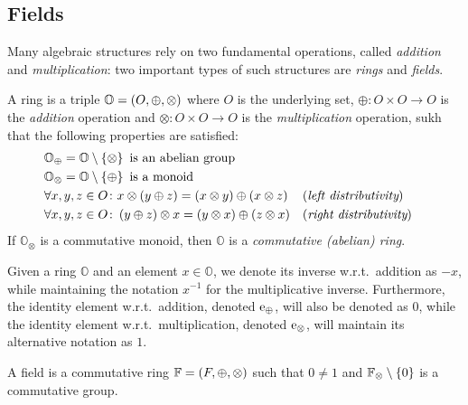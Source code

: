 \subsection{Fields}
Many algebraic structures rely on two fundamental operations, called \emph{addition} and 
\emph{multiplication}: two important types of such structures are \emph{rings} and \emph{fields}.
\begin{definition}[Ring]
  A ring is a triple \(\mathbb{O} = \left(O, \oplus, \otimes\right)\) where \(O\) is the 
  underlying set, \(\oplus\colon O \times O \to O\) is the \emph{addition} operation and 
  \(\otimes\colon O \times O \to O\) is the \emph{multiplication} operation, sukh that the 
  following properties are satisfied:
  \begin{align*}
    & \mathbb{O}_{\oplus} = \mathbb{O} \setminus \left\{\otimes\right\}
      \textnormal{ is an abelian group} \\
    & \mathbb{O}_{\otimes} = \mathbb{O} \setminus \left\{\oplus\right\} 
      \textnormal{ is a monoid} \\
    & \forall x,y,z \in O\colon x \otimes \left(y \oplus z\right) = 
      \left(x \otimes y\right) \oplus \left(x \otimes z\right) && (\emph{left distributivity})\\
    & \forall x,y,z \in O\colon \left(y \oplus z\right) \otimes x = 
      \left(y \otimes x\right) \oplus \left(z \otimes x\right) && (\emph{right distributivity})
  \end{align*}
  If \(\mathbb{O}_{\otimes}\) is a commutative monoid, then \(\mathbb{O}\) is a 
  \emph{commutative (abelian) ring}.
\end{definition}

Given a ring \(\mathbb{O}\) and an element \(x \in \mathbb{O}\), 
we denote its inverse w.r.t.\ addition as \(-x\), while maintaining the notation \(x^{-1}\) for 
the multiplicative inverse.
Furthermore, the identity element w.r.t.\ addition, denoted \(\mathrm{e}_{\oplus}\), will also be 
denoted as \(0\), while the identity element w.r.t.\ multiplication, denoted 
\(\mathrm{e}_{\otimes}\), will maintain its alternative notation as \(1\).

\begin{definition}[Field]
  A field is a commutative ring \(\mathbb{F} = \left(F, \oplus, \otimes\right)\) such that
  \(0 \neq 1\) and \(\mathbb{F}_{\otimes} \setminus \left\{0\right\}\) is a commutative group.
\end{definition}

